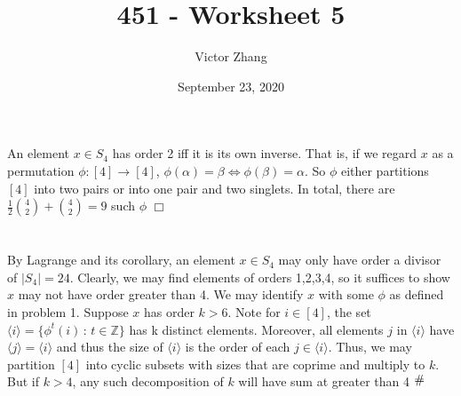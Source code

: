 \documentclass{article}
\title{451 - Worksheet 5}
\author{Victor Zhang}
\date{September 23, 2020}
\newcommand{\contra}{\raisebox{\depth}{\#}}
\begin{document}
\maketitle

\section{}
An element $x \in S_4$ has order 2 iff it is its own inverse. That is, if we regard $x$ as a permutation $\phi: [4] \rightarrow [4]$, $\phi(\alpha) = \beta \Longleftrightarrow \phi(\beta) = \alpha$. So $\phi$ either partitions $[4]$ into two pairs or into one pair and two singlets. In total, there are $\frac{1}{2}\binom{4}{2} + \binom{4}{2} = 9$ such $\phi$ $\Box$

\section{}
By Lagrange and its corollary, an element $x \in S_4$ may only have order a divisor of $|S_4| = 24$. Clearly, we may find elements of orders 1,2,3,4, so it suffices to show $x$ may not have order greater than 4. We may identify $x$ with some $\phi$ as defined in problem 1. Suppose $x$ has order $k > 6$. Note for $i \in [4]$, the set $\langle i \rangle = \{\phi^t(i) \, : \, t \in \mathbb{Z}\}$ has k distinct elements. Moreover, all elements $j$ in $\langle i \rangle$ have $\langle j \rangle = \langle i \rangle$ and thus the size of $\langle i \rangle$ is the order of each $j \in \langle i \rangle$. Thus, we may partition $[4]$ into cyclic subsets with sizes that are coprime and multiply to $k$. But if $k > 4$, any such decomposition of $k$ will have sum at greater than 4 $\contra$
\end{document}
